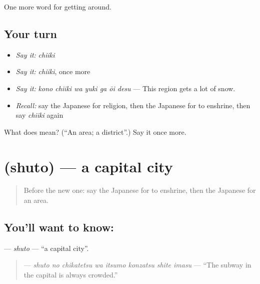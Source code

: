 \begin{grammarlens}[title={What you've built}]
One more word for getting around.
\end{grammarlens}

\subsection*{Your turn}
\begin{itemize}
\raggedright
  \item \emph{Say it:} \emph{chiiki}
  \item \emph{Say it:} \emph{chiiki}, once more
  \item \emph{Say it:} \emph{kono chiiki wa yuki ga ōi desu} — This region gets a lot of snow.
  \item \emph{Recall:} say the Japanese for religion, then the Japanese for to enshrine, then say \emph{chiiki} again
\end{itemize}

\begin{tcolorbox}[breakable,colback=teal!4,colframe=teal!35!black,title={Before you move on}]
What does  mean? (\textquotedblleft{}An area; a district\textquotedblright{}.) Say it once more.
\end{tcolorbox}
\section[\texorpdfstring{\ja{しゅと} (shuto)}{しゅと (shuto)}]{ (shuto) — a capital city}

\label{lesson:JA-C409-shuto}



\begin{quote}
Before the new one: say the Japanese for to enshrine, then the Japanese for an area.
\end{quote}

\subsection*{You'll want to know: }
\textbf{} — \emph{shuto} — \textquotedblleft{}a capital city\textquotedblright{}.

\begin{quote}
\textbf{   } — \emph{shuto no chikatetsu wa itsumo konzatsu shite imasu} — \textquotedblleft{}The subway in the capital is always crowded.\textquotedblright{}
\end{quote}

